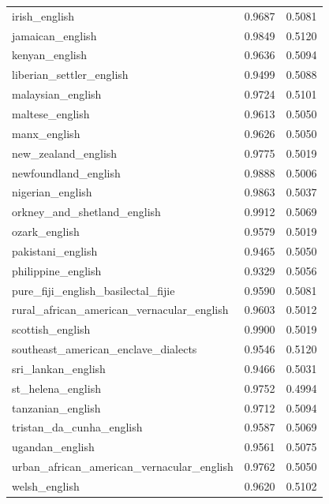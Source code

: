\begin{landscape}
\begin{longtable}{lcc}
irish\_english & 0.9687 & 0.5081 \\
jamaican\_english & 0.9849 & 0.5120 \\
kenyan\_english & 0.9636 & 0.5094 \\
liberian\_settler\_english & 0.9499 & 0.5088 \\
malaysian\_english & 0.9724 & 0.5101 \\
maltese\_english & 0.9613 & 0.5050 \\
manx\_english & 0.9626 & 0.5050 \\
new\_zealand\_english & 0.9775 & 0.5019 \\
newfoundland\_english & 0.9888 & 0.5006 \\
nigerian\_english & 0.9863 & 0.5037 \\
orkney\_and\_shetland\_english & 0.9912 & 0.5069 \\
ozark\_english & 0.9579 & 0.5019 \\
pakistani\_english & 0.9465 & 0.5050 \\
philippine\_english & 0.9329 & 0.5056 \\
pure\_fiji\_english\_basilectal\_fijie & 0.9590 & 0.5081 \\
rural\_african\_american\_vernacular\_english & 0.9603 & 0.5012 \\
scottish\_english & 0.9900 & 0.5019 \\
southeast\_american\_enclave\_dialects & 0.9546 & 0.5120 \\
sri\_lankan\_english & 0.9466 & 0.5031 \\
st\_helena\_english & 0.9752 & 0.4994 \\
tanzanian\_english & 0.9712 & 0.5094 \\
tristan\_da\_cunha\_english & 0.9587 & 0.5069 \\
ugandan\_english & 0.9561 & 0.5075 \\
urban\_african\_american\_vernacular\_english & 0.9762 & 0.5050 \\
welsh\_english & 0.9620 & 0.5102 \\
\bottomrule
\end{longtable}
\end{landscape}